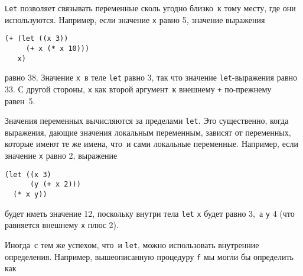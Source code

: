 \begin{plainlist}

\item
{\tt Let}
позволяет связывать переменные
сколь угодно близко~к тому месту, где они используются. Например, если
значение {\tt x} равно 5, значение выражения

\begin{Verbatim}[fontsize=\small]
(+ (let ((x 3))
     (+ x (* x 10)))
   x)
\end{Verbatim}
равно 38.  Значение {\tt x}~в теле {\tt let} равно 3,
так что значение {\tt let}-выражения равно 33. С другой
стороны, {\tt x} как второй аргумент~к внешнему {\tt +}
по-прежнему равен~5.

\item
Значения переменных вычисляются за пределами
{\tt let}.  Это существенно, когда выражения, дающие
значения локальным переменным, зависят от переменных, которые имеют те
же имена, что~и сами локальные переменные.  Например, если значение
{\tt x} равно 2, выражение

\begin{Verbatim}[fontsize=\small]
(let ((x 3)
      (y (+ x 2)))
  (* x y))
\end{Verbatim}
будет иметь значение 12, поскольку внутри тела {\tt let}
{\tt x} будет равно 3,~а {\tt y} 4 (что равняется
внешнему {\tt x} плюс 2).
\end{plainlist}

%
Иногда~с тем же успехом, что~и {\tt let}, можно
использовать внутренние определения.  Например, вышеописанную
процедуру {\tt f} мы могли бы определить как

